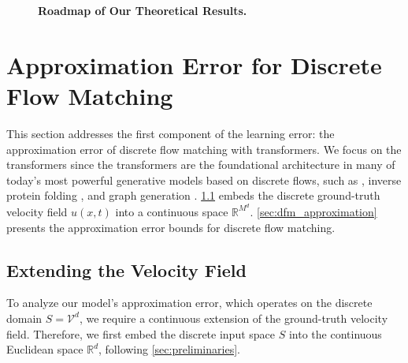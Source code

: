 \documentclass[12pt]{article}
\numberwithin{equation}{section}
\def\R{\mathbb{R}}
\let\cite\citep
\theoremstyle{theoremstyle}
\numberwithin{equation}{section}
\numberwithin{theorem}{section}
\numberwithin{proposition}{section}
\numberwithin{definition}{section}
\numberwithin{lemma}{section}
\numberwithin{assumption}{section}
\numberwithin{remark}{section}
\begin{document}
\begin{figure}[h!]
{
}
\vspace{-1em}
\caption{\small
\textbf{Roadmap of Our Theoretical Results.}
}
\label{fig:results_roadmap}
\end{figure}


\section{Approximation Error for Discrete Flow Matching}
\label{sec:dfm_approximation_rates}
\vspace{-1mm}




This section addresses the first component of the learning error: the approximation error of discrete flow matching with transformers.
We focus on the transformers since the transformers are the foundational architecture in many of today's most powerful generative models based on discrete flows, such as \cite{fuest2025maskflow}, inverse protein folding \cite{yi2025all}, and graph generation \cite{qin2024defog}. 
\cref{sec:extension_main} embeds the discrete ground-truth velocity field $u(x,t)$ into a continuous space $\R^{M^d}$.
\cref{sec:dfm_approximation} presents the approximation error bounds for discrete flow matching.


\vspace{-1mm}
\subsection{Extending the Velocity Field}
\label{sec:extension_main}

\vspace{-1mm}

To analyze our model's approximation error, which operates on the discrete domain $S = \mathcal{V}^d$, we require a continuous extension of the ground-truth velocity field. 
Therefore, we first embed the discrete input space $S$ into the continuous Euclidean space $\mathbb{R}^d$, following \cref{sec:preliminaries}.
\end{document}

